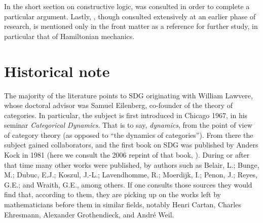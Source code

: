 In the short section on constructive logic, \cite{fra84} was consulted in order to complete a particular argument. Lastly, \cite{nish96}, though consulted extensively at an earlier phase of research, is mentioned only in the front matter as a reference for further study, in particular that of Hamiltonian mechanics. 

\section{Historical note}

The majority of the literature points to SDG originating with William Lawvere, whose doctoral advisor was Samuel Eilenberg, co-founder of the theory of categories. In particular, the subject is first introduced in Chicago 1967, in his seminar \textit{Categorical Dynamics}. That is to say, \textit{dynamics}, from the point of view of category theory (as opposed to ``the dynamics of categories''). From there the subject gained collaborators, and the first book on SDG was published by Anders Kock in 1981 (here we consult the 2006 reprint of that book, \cite{kock06}). During or after that time many other works were published, by authors such as Belair, L.; Bunge, M.; Dubuc, E.J.; Koszul, J.-L.; Lavendhomme, R.; Moerdijk, I.; Penon, J.; Reyes, G.E.; and Wraith, G.E., among others. If one consults those sources they would find that, according to them, they are picking up on the works left by mathematicians before them in similar fields, notably Henri Cartan, Charles Ehresmann, Alexander Grothendieck, and Andr\'e Weil. 

